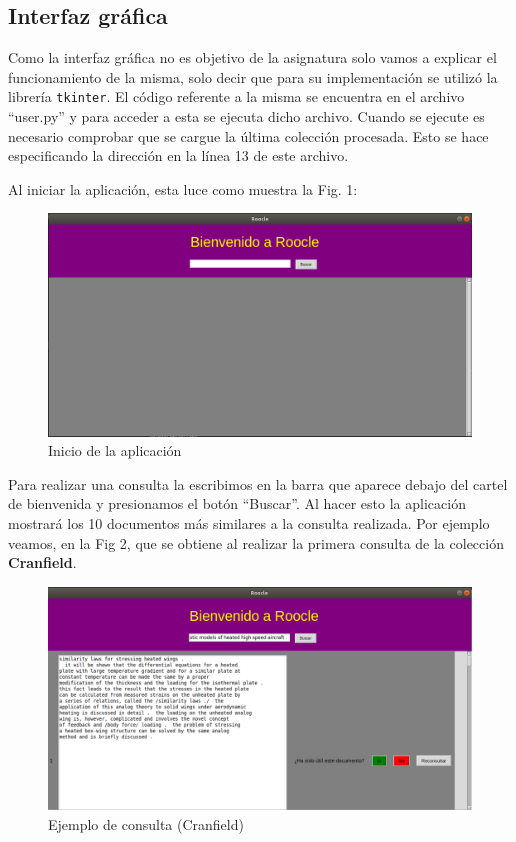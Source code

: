 \documentclass[runningheads]{llncs}
\begin{document}
	\subsection{Interfaz gr\'afica}
	
	Como la interfaz gr\'afica no es objetivo de la asignatura solo vamos a explicar el funcionamiento de la misma, solo decir que para su implementaci\'on se utiliz\'o la librer\'ia \verb|tkinter|. El c\'odigo referente a la misma se encuentra en el archivo ``user.py'' y para acceder a esta se ejecuta dicho archivo. Cuando se ejecute es necesario comprobar que se cargue la \'ultima colecci\'on procesada. Esto se hace especificando la direcci\'on en la l\'inea 13 de este archivo. 
	
	Al iniciar la aplicaci\'on, esta luce como muestra la Fig. 1:
	
	\begin{figure}[h]
		\begin{center}
			\includegraphics[width =12.0cm]{inicio.png}
			\caption[Fig1]{Inicio de la aplicaci\'on}		
		\end{center}
	\end{figure}
	
	Para realizar una consulta la escribimos en la barra que aparece debajo del cartel de bienvenida y presionamos el bot\'on ``Buscar''. Al hacer esto la aplicaci\'on mostrar\'a los 10 documentos m\'as similares a la consulta realizada. Por ejemplo veamos, en la Fig 2, que se obtiene al realizar la primera consulta de la colecci\'on \textbf{Cranfield}.
	
	\begin{figure}[h]
		\begin{center}
			\includegraphics[width =12.0cm]{consulta.png}	
			\caption[Fig2]{Ejemplo de consulta (Cranfield)}	
		\end{center}
	\end{figure}
	
\end{document}
